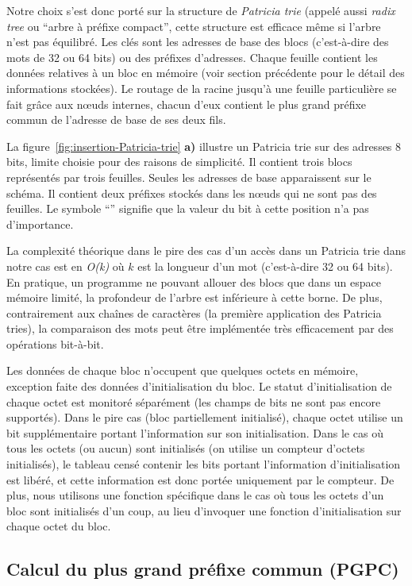 Notre choix s'est donc porté sur la structure de {\em Patricia trie}
\cite{Szpankowski/90} (appelé aussi {\em radix tree} ou ``arbre à préfixe
compact'', cette structure est efficace même si l'arbre n'est pas équilibré.
Les clés sont les adresses de base des blocs (c'est-à-dire des mots de 32 ou 64
bits) ou des préfixes d'adresses.
Chaque feuille contient les données relatives à un bloc en mémoire (voir
section précédente pour le détail des informations stockées).
Le routage de la racine jusqu'à une feuille particulière se fait grâce aux
n\oe{}uds internes, chacun d'eux contient le plus grand préfixe commun de
l'adresse de base de ses deux fils.

La figure~\ref{fig:insertion-Patricia-trie} \textbf{a)} illustre un Patricia
trie sur des adresses 8 bits, limite choisie pour des raisons de simplicité.
Il contient trois blocs représentés par trois feuilles.
Seules les adresses de base apparaissent sur le schéma.
Il contient deux préfixes stockés dans les n\oe{}uds qui ne sont pas des
feuilles.
Le symbole ``{\tt *}'' signifie que la valeur du bit à cette position n'a pas
d'importance.

La complexité théorique dans le pire des cas d'un accès dans un Patricia trie
dans notre cas est en {\em O(k)} où $k$ est la longueur d'un mot (c'est-à-dire
32 ou 64 bits).
En pratique, un programme ne pouvant allouer des blocs que dans un
espace mémoire limité, la profondeur de l'arbre est inférieure à cette borne.
De plus, contrairement aux chaînes de caractères (la première application des
Patricia tries), la comparaison des mots peut être implémentée très
efficacement par des opérations bit-à-bit.

Les données de chaque bloc n'occupent que quelques octets en mémoire, exception
faite des données d'initialisation du bloc.
Le statut d'initialisation de chaque octet est monitoré séparément (les champs
de bits ne sont pas encore supportés).
Dans le pire cas (bloc partiellement initialisé), chaque octet utilise un bit
supplémentaire portant l'information sur son initialisation.
Dans le cas où tous les octets (ou aucun) sont initialisés (on utilise un
compteur d'octets initialisés), le tableau censé contenir les bits portant
l'information d'initialisation est libéré, et cette information est donc portée
uniquement par le compteur.
De plus, nous utilisons une fonction spécifique dans le cas où tous les octets
d'un bloc sont initialisés d'un coup, au lieu d'invoquer une fonction
d'initialisation sur chaque octet du bloc.


\subsection{Calcul du plus grand préfixe commun (PGPC)}


